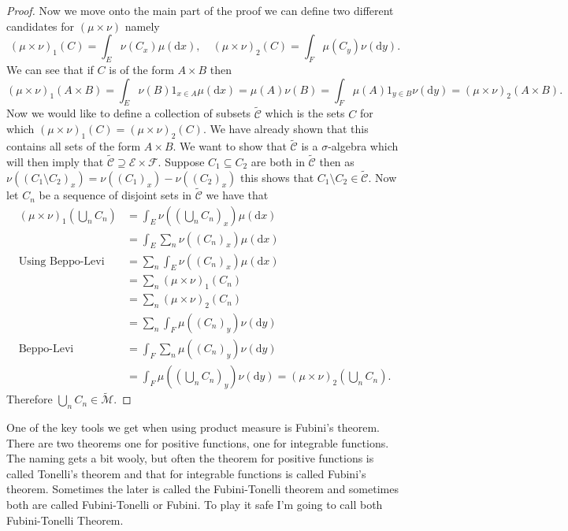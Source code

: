 \documentclass[11pt]{article}
\theoremstyle{definition}
\theoremstyle{remark}
\begin{document}
\begin{proof}
Now we move onto the main part of the proof we can define two different candidates for $(\mu \times \nu)$ namely
\[ (\mu \times \nu)_1(C) = \int_E \nu(C_x) \mu(\mathrm{d}x), \quad (\mu \times \nu)_2(C) = \int_F \mu(C_y) \nu(\mathrm{d}y). \] We can see that if $C$ is of the form $A \times B$ then
\[ (\mu \times \nu)_1(A \times B) = \int_E \nu(B)1_{x \in A} \mu(\mathrm{d}x) = \mu(A) \nu(B) = \int_F \mu(A)1_{y \in B} \nu(\mathrm{d}y) = (\mu \times \nu)_2 (A \times B). \] Now we would like to define a collection of subsets $\tilde{\mathcal{C}}$ which is the sets $C$ for which $(\mu \times \nu)_1 (C) = (\mu \times \nu)_2(C)$. We have already shown that this contains all sets of the form $A \times B$. We want to show that $\tilde{\mathcal{C}}$ is a $\sigma$-algebra which will then imply that $\tilde{\mathcal{C}} \supseteq \mathcal{E} \times \mathcal{F}$. Suppose $C_1 \subseteq C_2$ are both in $\tilde{\mathcal{C}}$ then as $\nu((C_1 \setminus C_2)_x) = \nu((C_1)_x) - \nu((C_2)_x)$ this shows that $C_1 \setminus C_2 \in \tilde{\mathcal{C}}$. Now let $C_n$ be a sequence of disjoint sets in $\tilde{\mathcal{C}}$ we have that
\begin{align*} (\mu \times \nu)_1\left( \bigcup_n C_n \right) &= \int_E \nu \left( \left( \bigcup_n C_n\right)_x\right) \mu(\mathrm{d}x )\\
&= \int_E \sum_n \nu((C_n)_x) \mu(\mathrm{d}x) \\
\mbox{Using Beppo-Levi} \quad &= \sum_n \int_E \nu((C_n)_x) \mu(\mathrm{d}x)\\
&= \sum_n (\mu \times \nu)_1 (C_n)\\
&= \sum_n (\mu \times \nu)_2(C_n)\\
&= \sum_n \int_F \mu((C_n)_y) \nu(\mathrm{d}y)\\
\mbox{Beppo-Levi} &= \int_F \sum_n \mu((C_n)_y) \nu(\mathrm{d}y)\\
&= \int_F \mu \left( \left( \bigcup_n C_n \right)_y \right) \nu(\mathrm{d}y) = (\mu \times \nu)_2 \left( \bigcup_n C_n \right).
\end{align*} Therefore $\bigcup_n C_n \in \tilde{\mathcal{M}}$.
\end{proof}

One of the key tools we get when using product measure is Fubini's theorem. There are two theorems one for positive functions, one for integrable functions. The naming gets a bit wooly, but often the theorem for positive functions is called Tonelli's theorem and that for integrable functions is called Fubini's theorem. Sometimes the later is called the Fubini-Tonelli theorem and sometimes both are called Fubini-Tonelli or Fubini. To play it safe I'm going to call both Fubini-Tonelli Theorem.
\end{document}
